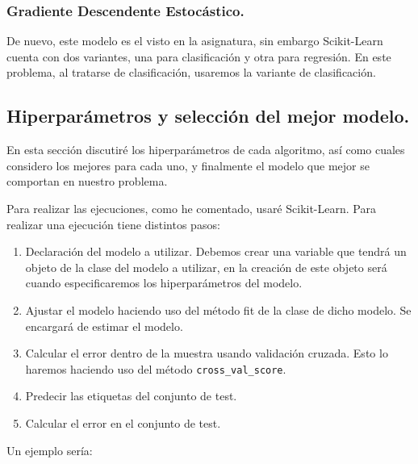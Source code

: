 \documentclass[12pt, spanish]{article}
\begin{document}
\subsubsection{Gradiente Descendente Estocástico.}

De nuevo, este modelo es el visto en la asignatura, sin embargo Scikit-Learn cuenta con dos variantes, una para clasificación y otra para regresión. En este problema, al tratarse de clasificación, usaremos la variante de clasificación\cite{sourceSGDClas}.


\newpage

\subsection{Hiperparámetros y selección del mejor modelo.}

En esta sección discutiré los hiperparámetros de cada algoritmo, así como cuales considero los mejores para cada uno, y finalmente el modelo que mejor se comportan en nuestro problema.

Para realizar las ejecuciones, como he comentado, usaré Scikit-Learn. Para realizar una ejecución tiene distintos pasos:

\begin{enumerate}
	\item Declaración del modelo a utilizar. Debemos crear una variable que tendrá un objeto de la clase del modelo a utilizar, en la creación de este objeto será cuando especificaremos los hiperparámetros del modelo.
	\item Ajustar el modelo haciendo uso del método fit de la clase de dicho modelo. Se encargará de estimar el modelo.
	\item Calcular el error dentro de la muestra usando validación cruzada. Esto lo haremos haciendo uso del método \texttt{cross\_val\_score}.
	\item Predecir las etiquetas del conjunto de test.
	\item Calcular el error en el conjunto de test.
\end{enumerate}

Un ejemplo sería:
\end{document}
